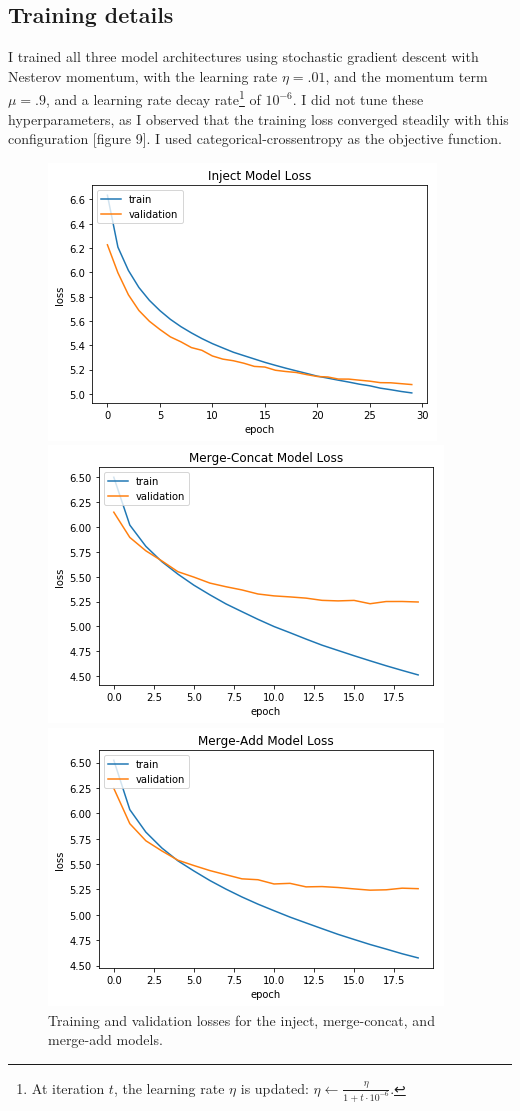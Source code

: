 \documentclass[letterpaper, 10 pt, conference]{ieeeconf}
\begin{document}
\subsection{Training details}

I trained all three model architectures using stochastic gradient descent with Nesterov momentum, with the learning rate $\eta = .01$, and the momentum term $\mu = .9$, and a learning rate decay rate\footnote{At iteration $t$, the learning rate $\eta$ is updated: $\eta \gets \frac{\eta}{1  + t\cdot10^{-6}}$.} of $10^{-6}$. I did not tune these hyperparameters, as I observed that the training loss converged steadily with this configuration [figure 9]. I used categorical-crossentropy as the objective function.

\begin{figure}[h]
\centering
\includegraphics[width=.75\linewidth]{inject_loss}

\includegraphics[width=.75\linewidth]{merge_concat_loss}

\includegraphics[width=.75\linewidth]{merge_add_loss}

\caption{Training and validation losses for the inject, merge-concat, and merge-add models.}
\label{fig:test1}
\end{figure}
\end{document}
